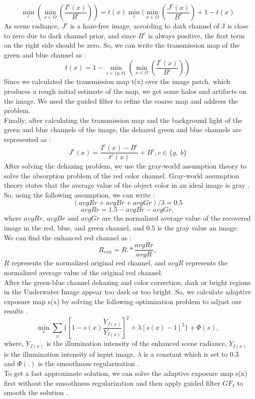\documentclass[a4paper,11pt,oneside]{article}
\begin{document}
$$\min_{c}(\min_{x\in\Omega}(\frac{I^{c}(x)}{B^{c}}))=t(x)\min_{c}(\min_{x\in\Omega}(\frac{J^{c}(x)}{B^{c}})+1-t(x)$$
As scene radiance, $J^{c}$ is a haze-free image, according to \cite{27} dark channel of J is close to zero due to dark channel prior, and since $B^c$ is always positive, the first term on the right side should be zero. So, we can write the transmission map of the green and blue channel as \cite{26}:
$$t(x)=1- \min_{ c\in\{g,b\}}(\min_{x\in\Omega}(\frac{I^{c}(x)}{B^{c}}))$$
Since we calculated the transmission map t(x) over the image patch, which produces a rough initial estimate of the map, we get some halos and artifacts on the image. We used the guided filter to refine the coarse map and address the problem. \cite{26}\\
Finally, after calculating the transmission map and the background light of the green and blue channels of the image, the dehazed green and blue channels are represented as \cite{26}:
$$J^{c}(x)=\frac{I^{c}(x)-B^{c}}{t^{c}(x)}+B^{c}, c\in\{g,\ b\}$$
After solving the dehazing problem, we use the gray-world assumption theory to solve the absorption problem of the red color channel. Gray-world assumption theory states that the average value of the object color in an ideal image is gray \cite{26}. So, using the following assumption, we can write \cite{26}:
$$(avgRr+avgBr+avgGr)/3=0.5$$
$$avgRr=1.5-avgBr-avgGr,$$
where $avgRr$, $avgBr$ and $avgGr$ are the normalized average value of the recovered image in the red, blue, and green channel, and $0.5$ is the gray value an image.\\
We can find the enhanced red channel as \cite{26}:
$$R_{enh} = R. * \frac{avgRr}{avgR},$$
$R$ represents the normalized original red channel, and $avgR$ represents the normalized average value of the original red channel.\\
After the green-blue channel dehazing and color correction, dark or bright regions in the Underwater Image appear too dark or too bright. So, we calculate adaptive exposure map s(x) by solving the following optimization problem to adjust our results \cite{26}.
$$\min_{s}\sum_{x}\{[1-s(x)\frac{Y_{J(x)}}{Y_{I(x)}}]^{2}+\lambda[s(x)-1]^{2}\}+\Phi(s),$$
where, $Y_{J(x)}$ is the illumination intensity of the enhanced scene radiance, $Y_{I(x)}$ is the illumination intensity of input image, $\lambda$ is a constant which is set to 0.3 and $\Phi(.)$ is the smoothness regularization \cite{26}.\\
 To get a fast approximate solution, we can solve the adaptive exposure map s(x) first without the smoothness regularization and then apply guided filter $GF_I$ to smooth the solution \cite{26}.
\end{document}
